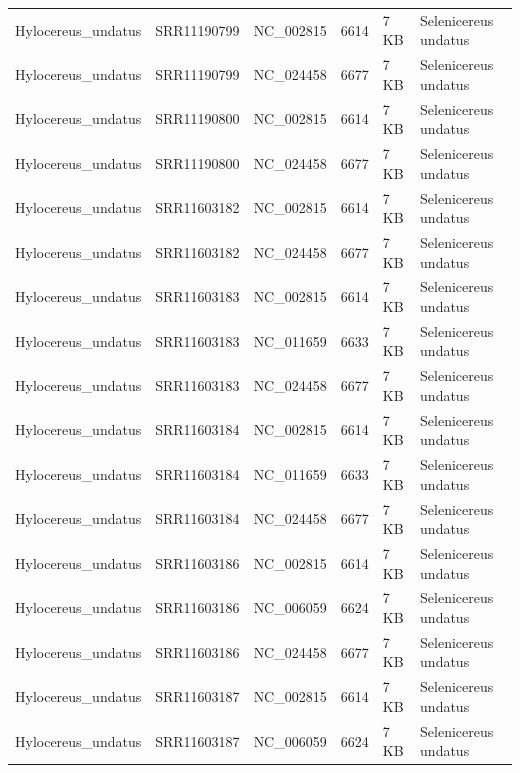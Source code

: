 \documentclass[fleqn,10pt,lineno]{wlpeerj}
\begin{document}
\begin{table}[ht]
{\begin{tabular}{@{}llllll@{}}
Hylocereus\_undatus    & SRR11190799  & NC\_002815              & 6614            & 7 KB & Selenicereus undatus    \\
Hylocereus\_undatus    & SRR11190799  & NC\_024458              & 6677            & 7 KB & Selenicereus undatus    \\
Hylocereus\_undatus    & SRR11190800  & NC\_002815              & 6614            & 7 KB & Selenicereus undatus    \\
Hylocereus\_undatus    & SRR11190800  & NC\_024458              & 6677            & 7 KB & Selenicereus undatus    \\
Hylocereus\_undatus    & SRR11603182  & NC\_002815              & 6614            & 7 KB & Selenicereus undatus    \\
Hylocereus\_undatus    & SRR11603182  & NC\_024458              & 6677            & 7 KB & Selenicereus undatus    \\
Hylocereus\_undatus    & SRR11603183  & NC\_002815              & 6614            & 7 KB & Selenicereus undatus    \\
Hylocereus\_undatus    & SRR11603183  & NC\_011659              & 6633            & 7 KB & Selenicereus undatus    \\
Hylocereus\_undatus    & SRR11603183  & NC\_024458              & 6677            & 7 KB & Selenicereus undatus    \\
Hylocereus\_undatus    & SRR11603184  & NC\_002815              & 6614            & 7 KB & Selenicereus undatus    \\
Hylocereus\_undatus    & SRR11603184  & NC\_011659              & 6633            & 7 KB & Selenicereus undatus    \\
Hylocereus\_undatus    & SRR11603184  & NC\_024458              & 6677            & 7 KB & Selenicereus undatus    \\
Hylocereus\_undatus    & SRR11603186  & NC\_002815              & 6614            & 7 KB & Selenicereus undatus    \\
Hylocereus\_undatus    & SRR11603186  & NC\_006059              & 6624            & 7 KB & Selenicereus undatus    \\
Hylocereus\_undatus    & SRR11603186  & NC\_024458              & 6677            & 7 KB & Selenicereus undatus    \\
Hylocereus\_undatus    & SRR11603187  & NC\_002815              & 6614            & 7 KB & Selenicereus undatus    \\
Hylocereus\_undatus    & SRR11603187  & NC\_006059              & 6624            & 7 KB & Selenicereus undatus    \\

\end{tabular}}
\end{table}
\end{document}

